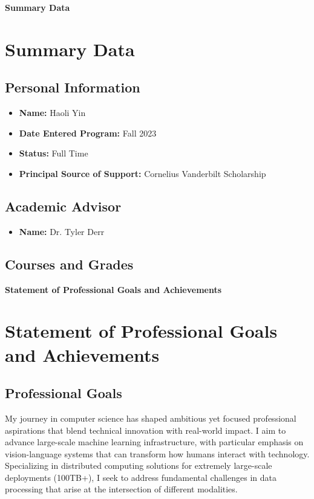 \documentclass[12pt,letterpaper]{report}
\newcommand{\sectiondivider}[1]{%
    \clearpage
    \thispagestyle{empty}
    \begin{center}
        \vspace*{\fill}
        {\Huge\bfseries\textcolor{vanderbiltblack}{#1}}
        \vspace*{\fill}
    \end{center}
    \clearpage
}
\begin{document}
\tableofcontents
\clearpage

\sectiondivider{Summary Data}
\chapter{Summary Data}

\section{Personal Information}
\begin{itemize}
    \item \textbf{Name:} Haoli Yin
    \item \textbf{Date Entered Program:} Fall 2023
    \item \textbf{Status:} Full Time
    \item \textbf{Principal Source of Support:} Cornelius Vanderbilt Scholarship
\end{itemize}

\section{Academic Advisor}
\begin{itemize}
    \item \textbf{Name:} Dr. Tyler Derr
\end{itemize}

\section{Courses and Grades}



\sectiondivider{Statement of Professional Goals and Achievements}
\chapter{Statement of Professional Goals and Achievements}

\section{Professional Goals}
My journey in computer science has shaped ambitious yet focused professional aspirations that blend technical innovation with real-world impact. I aim to advance large-scale machine learning infrastructure, with particular emphasis on vision-language systems that can transform how humans interact with technology. Specializing in distributed computing solutions for extremely large-scale deployments (100TB+), I seek to address fundamental challenges in data processing that arise at the intersection of different modalities.
\end{document}
